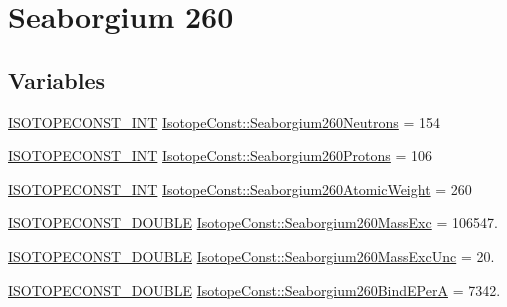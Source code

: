 \hypertarget{group___isotope_const-_seaborgium-_sg260}{}\section{Seaborgium 260}
\label{group___isotope_const-_seaborgium-_sg260}
\subsection*{Variables}
\begin{DoxyCompactItemize}
\item 
\mbox{\hyperlink{group___isotope_const-_macros_ga5f18360b3e99483a35c32d789e62621c}{I\+S\+O\+T\+O\+P\+E\+C\+O\+N\+S\+T\+\_\+\+I\+NT}} \mbox{\hyperlink{group___isotope_const-_seaborgium-_sg260_ga9dac3a58c46f628560d39f783661f3d7}{Isotope\+Const\+::\+Seaborgium260\+Neutrons}} = 154
\item 
\mbox{\hyperlink{group___isotope_const-_macros_ga5f18360b3e99483a35c32d789e62621c}{I\+S\+O\+T\+O\+P\+E\+C\+O\+N\+S\+T\+\_\+\+I\+NT}} \mbox{\hyperlink{group___isotope_const-_seaborgium-_sg260_ga6daf409d7dcb2e3caf11349bf6679d35}{Isotope\+Const\+::\+Seaborgium260\+Protons}} = 106
\item 
\mbox{\hyperlink{group___isotope_const-_macros_ga5f18360b3e99483a35c32d789e62621c}{I\+S\+O\+T\+O\+P\+E\+C\+O\+N\+S\+T\+\_\+\+I\+NT}} \mbox{\hyperlink{group___isotope_const-_seaborgium-_sg260_ga6f1a0d2fbae3c9672de856430f3c295e}{Isotope\+Const\+::\+Seaborgium260\+Atomic\+Weight}} = 260
\item 
\mbox{\hyperlink{group___isotope_const-_macros_ga8f45a7272ce02c0b4c65c44636ed719a}{I\+S\+O\+T\+O\+P\+E\+C\+O\+N\+S\+T\+\_\+\+D\+O\+U\+B\+LE}} \mbox{\hyperlink{group___isotope_const-_seaborgium-_sg260_ga7441bbe8ce1c8d4ba603d3ed23759451}{Isotope\+Const\+::\+Seaborgium260\+Mass\+Exc}} = 106547.
\item 
\mbox{\hyperlink{group___isotope_const-_macros_ga8f45a7272ce02c0b4c65c44636ed719a}{I\+S\+O\+T\+O\+P\+E\+C\+O\+N\+S\+T\+\_\+\+D\+O\+U\+B\+LE}} \mbox{\hyperlink{group___isotope_const-_seaborgium-_sg260_ga6f001cad36566e93d8d1569b4c5a8726}{Isotope\+Const\+::\+Seaborgium260\+Mass\+Exc\+Unc}} = 20.
\item 
\mbox{\hyperlink{group___isotope_const-_macros_ga8f45a7272ce02c0b4c65c44636ed719a}{I\+S\+O\+T\+O\+P\+E\+C\+O\+N\+S\+T\+\_\+\+D\+O\+U\+B\+LE}} \mbox{\hyperlink{group___isotope_const-_seaborgium-_sg260_ga3949f7849ac7db0bc5e20182d7c4aa4c}{Isotope\+Const\+::\+Seaborgium260\+Bind\+E\+PerA}} = 7342.

\end{DoxyCompactItemize}
